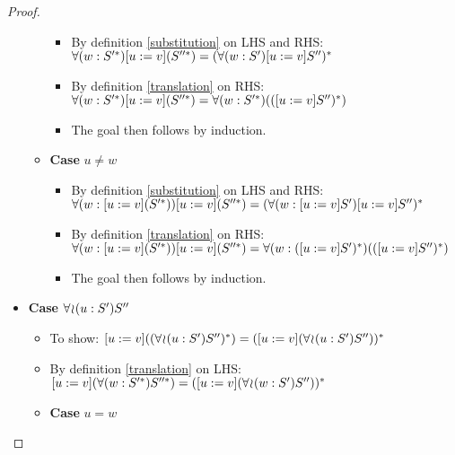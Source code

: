 \begin{proof}
\begin{itemize}
\begin{itemize}
            \begin{itemize}
                \item By definition \ref{substitution} on LHS and RHS:
                    $\forall(w:S'^{*})[u := v](S''^{*}) =
                    (\forall(w:S')[u := v]S'')^{*}$
                \item By definition \ref{translation} on RHS: \\
                    $\forall(w:S'^{*})[u := v](S''^{*}) =
                    \forall(w:S'^{*})(([u := v]S'')^{*})$
                \item The goal then follows by induction.
            \end{itemize}
            \item \textbf{Case} $u \neq w$
            \begin{itemize}
                \item By definition \ref{substitution} on LHS and RHS: \\
                    $\forall(w:[u := v](S'^{*}))[u := v](S''^{*}) =
                    (\forall(w:[u := v]S')[u := v]S'')^{*}$
                \item By definition \ref{translation} on RHS: \\
                    $\forall(w:[u := v](S'^{*}))[u := v](S''^{*}) =
                    \forall(w:([u := v]S')^{*})(([u := v]S'')^{*})$
                \item The goal then follows by induction.
            \end{itemize}
        \end{itemize}
        \item \textbf{Case} $\forall\!\wr\!(u:S')S''$
        \begin{itemize}
            \item To show: $[u := v]((\forall\!\wr\!(u:S')S'')^{*}) =
                ([u := v](\forall\!\wr\!(u:S')S''))^{*}$
            \item By definition \ref{translation} on LHS:
                $[u := v](\forall(w:S'^{*})S''^{*}) =
                ([u := v](\forall\!\wr\!(w:S')S''))^{*}$
            \item \textbf{Case} $u = w$
\end{itemize}
\end{itemize}
\end{proof}
